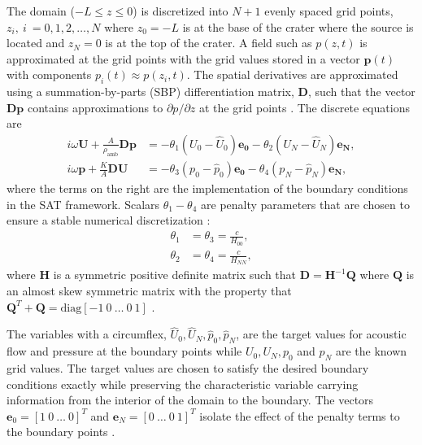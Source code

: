 \documentclass[10pt]{article}
\begin{document}
The domain ($-L \leq z \leq 0$) is discretized into $N+1$ evenly spaced grid points, $z_i,~i~=0,1, 2,\hdots,N$ where $z_0=-L$ is at the base of the crater where the source is located and $z_N=0$ is at the top of the crater. A field such as $p(z, t)$ is approximated at the grid points with the grid values stored in a vector $\boldsymbol{p}(t)$ with components $p_i(t) \approx p(z_i, t)$. The spatial derivatives are approximated using a summation-by-parts (SBP) differentiation matrix, $\boldsymbol{D}$, such that the vector $\boldsymbol{Dp}$ contains approximations to $\partial p / \partial z$ at the grid points \citep{Karlstrom2016a}. The discrete equations are
\begin{align}
i \omega \boldsymbol{U} + \frac{A}{\rho_\text{amb}} \boldsymbol{D p} & = -\theta_1 (U_0-\hat{U}_0) \boldsymbol{e_0} - \theta_2 (U_N - \hat{U}_N) \boldsymbol{e_N}, \\
i \omega \boldsymbol{p} + \frac{K}{A} \boldsymbol{DU} & = -\theta_3 (p_0 - \hat{p}_0) \boldsymbol{e_0} - \theta_4 (p_N - \hat{p}_N) \boldsymbol{e_N},
\end{align}
where the terms on the right are the implementation of the boundary conditions in the SAT framework. Scalars $\theta_1-\theta_4$ are penalty parameters that are chosen to ensure a stable numerical discretization  \citep{Kozdon2012a}:
\begin{align}
\theta_1 & = \theta_3 = \frac{c}{H_{00}}, \\
\theta_2 & = \theta_4 = \frac{c}{H_{NN}},
\end{align}
where $\boldsymbol{H}$ is a symmetric positive definite matrix such that $\boldsymbol{D} = \boldsymbol{H}^{-1} \boldsymbol{Q}$ where $\boldsymbol{Q}$ is an almost skew symmetric matrix with the property that $\boldsymbol{Q}^T + \boldsymbol{Q} = \text{diag}[-1~0~\hdots~0~1]$ \citep{Karlstrom2016a}.

The variables with a circumflex, $\hat{U}_0, \hat{U}_N, \hat{p}_0, \hat{p}_N$, are the target values for acoustic flow and pressure at the boundary points while $U_0, U_N, p_0$ and $p_N$ are the known grid values. The target values are chosen to satisfy the desired boundary conditions exactly while preserving the characteristic variable carrying information from the interior of the domain to the boundary. The vectors $\boldsymbol{e}_0 = [1~0~\hdots~0]^T$ and $\boldsymbol{e}_N = [0~\hdots~0~1]^T$ isolate the effect of the penalty terms to the boundary points \citep{Karlstrom2016a}.
\end{document}
